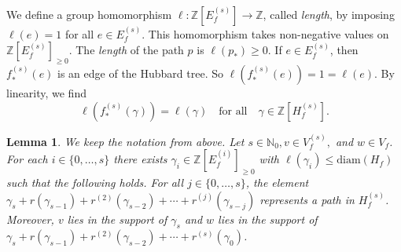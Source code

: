 \documentclass[12pt,oneside,a4]{amsart}
\newcommand{\IN}{\mathbb{N}}
\newcommand{\IZ}{\mathbb{Z}}
\newcounter{maincounter}
\numberwithin{maincounter}{section}
\numberwithin{equation}{section}
\newtheorem{lemma}[maincounter]{Lemma}
\begin{document}
We define a group homomorphism $\ell\colon
\IZ[E_f^{(s)}]\rightarrow\IZ$, called \textit{length}, by imposing
$\ell(e)=1$ for all $e\in E_f^{(s)}$. This homomorphism takes
non-negative values on $\IZ[E_f^{(s)}]_{\ge 0}$. The \textit{length}
of the path $p$ is $\ell(p_*)\ge 0$. If $e\in E_f^{(s)}$, then
$f^{(s)}_*(e)$ is an edge of the Hubbard tree. So
$\ell(f^{(s)}_*(e))=1=\ell(e)$. By linearity, we find
\begin{equation}
  \label{eq:ellisometryHfs}
  \ell(f_*^{(s)}(\gamma)) =\ell(\gamma)\quad\text{for all}\quad \gamma\in
  \IZ[H_f^{(s)}].
\end{equation}

\begin{lemma}
  \label{lem:connectionlemma}
  We keep the notation from above.
  Let $s\in \IN_0, v\in V_f^{(s)},$ and $w\in V_f$.
  For each $i\in \{0,\ldots,s\}$ there exists
  $\gamma_i \in \IZ[E_f^{(i)}]_{\ge 0}$ with 
  $\ell(\gamma_i)\le \mathrm{diam}(H_f)$ such that the following
  holds. For all $j\in \{0,\ldots,s\}$, the
  element $\gamma_s + r(\gamma_{s-1}) +
  r^{(2)}(\gamma_{s-2})+\cdots + r^{(j)}(\gamma_{s-j})$ represents a path
  in $H_f^{(s)}$. Moreover, $v$ lies in the
  support of $\gamma_s$ and $w$ lies in the support of
  $\gamma_s + r(\gamma_{s-1}) +
  r^{(2)}(\gamma_{s-2})+\cdots + r^{(s)}(\gamma_{0})$.
\end{lemma}
\end{document}
